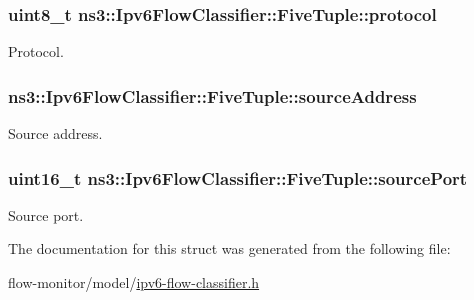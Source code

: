 \subsubsection[{\texorpdfstring{protocol}{protocol}}]{\setlength{\rightskip}{0pt plus 5cm}uint8\+\_\+t ns3\+::\+Ipv6\+Flow\+Classifier\+::\+Five\+Tuple\+::protocol}\hypertarget{structns3_1_1Ipv6FlowClassifier_1_1FiveTuple_a9e47ac11b908baf101e4ca2d34e10cba}{}\label{structns3_1_1Ipv6FlowClassifier_1_1FiveTuple_a9e47ac11b908baf101e4ca2d34e10cba}


Protocol. 

\subsubsection[{\texorpdfstring{source\+Address}{sourceAddress}}]{ ns3\+::\+Ipv6\+Flow\+Classifier\+::\+Five\+Tuple\+::source\+Address}\hypertarget{structns3_1_1Ipv6FlowClassifier_1_1FiveTuple_ac1f74288fb36b9dfae5b0eaacfa2d4c3}{}\label{structns3_1_1Ipv6FlowClassifier_1_1FiveTuple_ac1f74288fb36b9dfae5b0eaacfa2d4c3}


Source address. 

\subsubsection[{\texorpdfstring{source\+Port}{sourcePort}}]{\setlength{\rightskip}{0pt plus 5cm}uint16\+\_\+t ns3\+::\+Ipv6\+Flow\+Classifier\+::\+Five\+Tuple\+::source\+Port}\hypertarget{structns3_1_1Ipv6FlowClassifier_1_1FiveTuple_a7be9b9e8a14d35a600c1078b29b89ed6}{}\label{structns3_1_1Ipv6FlowClassifier_1_1FiveTuple_a7be9b9e8a14d35a600c1078b29b89ed6}


Source port. 



The documentation for this struct was generated from the following file\+:\begin{DoxyCompactItemize}
\item 
flow-\/monitor/model/\hyperlink{ipv6-flow-classifier_8h}{ipv6-\/flow-\/classifier.\+h}\end{DoxyCompactItemize}
